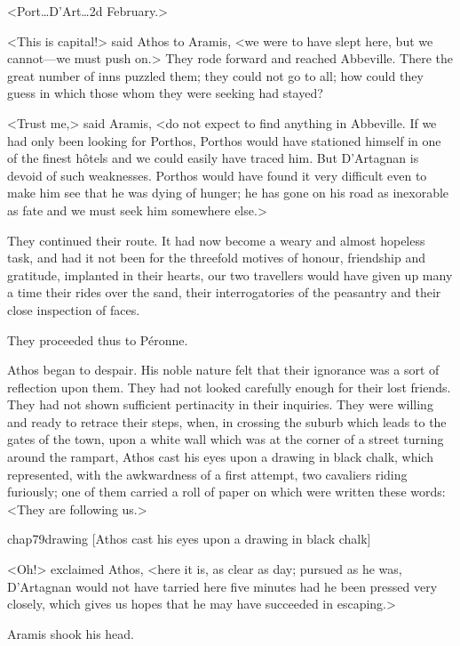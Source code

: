 <Port\dots D'Art\dots 2d February.>

<This is capital!> said Athos to Aramis, <we were to have slept here, but we cannot—we must push on.> They rode forward and reached Abbeville. There the great number of inns puzzled them; they could not go to all; how could they guess in which those whom they were seeking had stayed?

<Trust me,> said Aramis, <do not expect to find anything in Abbeville. If we had only been looking for Porthos, Porthos would have stationed himself in one of the finest hôtels and we could easily have traced him. But D'Artagnan is devoid of such weaknesses. Porthos would have found it very difficult even to make him see that he was dying of hunger; he has gone on his road as inexorable as fate and we must seek him somewhere else.>

They continued their route. It had now become a weary and almost hopeless task, and had it not been for the threefold motives of honour, friendship and gratitude, implanted in their hearts, our two travellers would have given up many a time their rides over the sand, their interrogatories of the peasantry and their close inspection of faces.

They proceeded thus to Péronne.

Athos began to despair. His noble nature felt that their ignorance was a sort of reflection upon them. They had not looked carefully enough for their lost friends. They had not shown sufficient pertinacity in their inquiries. They were willing and ready to retrace their steps, when, in crossing the suburb which leads to the gates of the town, upon a white wall which was at the corner of a street turning around the rampart, Athos cast his eyes upon a drawing in black chalk, which represented, with the awkwardness of a first attempt, two cavaliers riding furiously; one of them carried a roll of paper on which were written these words: <They are following us.>

\begin{bwbigpic}
	[\basicscale] 
	{chap79drawing}
	[Athos cast his eyes upon a drawing in black chalk]
\end{bwbigpic}

<Oh!> exclaimed Athos, <here it is, as clear as day; pursued as he was, D'Artagnan would not have tarried here five minutes had he been pressed very closely, which gives us hopes that he may have succeeded in escaping.>

Aramis shook his head.


